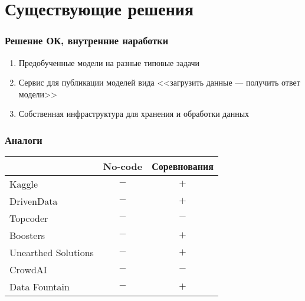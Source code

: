 \section{Существующие решения}

\begin{frame}
\frametitle{Решение ОК, внутренние наработки}
\begin{enumerate}
    \item Предобученные модели на разные типовые задачи
    \item Сервис для публикации моделей вида <<загрузить данные --- получить ответ модели>>
    \item Собственная инфраструктура для хранения и обработки данных
\end{enumerate}
\end{frame}

\begin{frame}
\frametitle{Аналоги}
\begin{center}
    \begin{tabular}{l|cc}
        & No-code & Соревнования \\
        \hline
        Kaggle              & $-$ & $+$ \\
        DrivenData          & $-$ & $+$ \\
        Topcoder            & $-$ & $-$ \\ %
        Boosters            & $-$ & $+$ \\
        Unearthed Solutions & $-$ & $+$ \\ %
        CrowdAI             & $-$ & $-$ \\
        Data Fountain       & $-$ & $+$ \\
    \end{tabular}
\end{center}
\end{frame}

